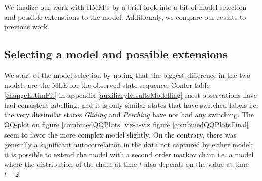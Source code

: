 We finalize our work with HMM's by a brief look into a bit of model selection and possible extenstions to the model. Additionaly, we compare our results to previous work. 
\subsection{Selecting a model and possible extensions}
We start of the model selection by noting that the biggest difference in the two models are the MLE for the observed state sequence. Confer table \ref{changeEstimFit} in appendix \ref{auxiliaryResultsModelling} most observations have had consistent labelling, and it is only similar states that have switched labels i.e. the very dissimilar states \textit{Gliding} and \textit{Perching} have not had any switching. The QQ-plot on figure \ref{combinedQQPlots} viz-a-viz figure \ref{combinedQQPlotsFinal} seem to favor the more complex model slightly. On the contrary, there was generally a significant autocorrelation in the data not captured by either model; it is possible to extend the model with a second order markov chain \cite{Thede1999} i.e. a model where the distribution of the chain at time $t$ also depends on the value at time $t-2$.\\
